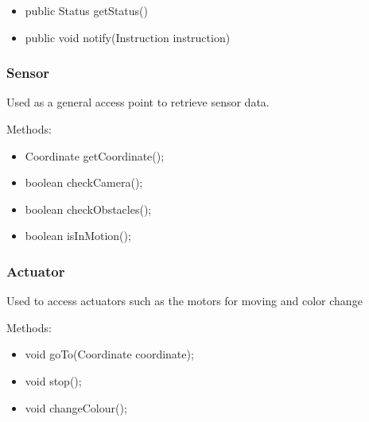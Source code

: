 \begin{itemize}
    \item public Status getStatus()
	\item public void notify(Instruction instruction)
\end{itemize}

\subsubsection{Sensor}
Used as a general access point to retrieve sensor data.

Methods:
\begin{itemize}
    \item Coordinate getCoordinate();
	\item boolean checkCamera();
	\item boolean checkObstacles();
    \item boolean isInMotion();
\end{itemize}

\subsubsection{Actuator}
Used to access actuators such as the motors for moving and color change

Methods:
\begin{itemize}
    \item void goTo(Coordinate coordinate);
	\item void stop();
	\item void changeColour();
\end{itemize}
